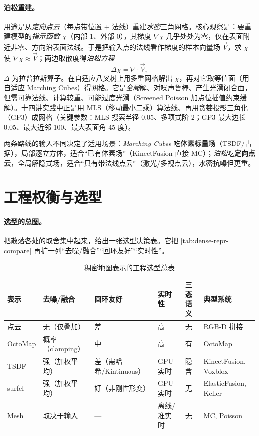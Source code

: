 \paragraph{泊松重建。}
用途是从\emph{定向点云}（每点带位置 $+$ 法线）重建\emph{水密}三角网格\cite{kazhdan2006poisson}。核心观察是：要重建模型的\emph{指示函数} $\chi$（内部 1、外部 0），其梯度 $\nabla\chi$ 几乎处处为零，仅在表面附近非零、方向沿表面法线。于是把输入点的法线看作梯度的样本向量场 $\vec{V}$，求 $\chi$ 使 $\nabla\chi\approx\vec{V}$；两边取散度得\emph{泊松方程}
\begin{equation}
  \Delta\chi=\nabla\cdot\vec{V},
  \label{eq:dense-poisson}
\end{equation}
$\Delta$ 为拉普拉斯算子。在自适应八叉树上用多重网格解出 $\chi$，再对它取等值面（用自适应 Marching Cubes）得网格。它是\emph{全局}解、对噪声鲁棒、产生光滑闭合面，但需可靠法线、计算较重、可能过度光滑（Screened Poisson 加点位插值约束缓解）。十四讲实践中正是用 MLS（移动最小二乘）算法线、再用贪婪投影三角化（GP3）成网格（关键参数：MLS 搜索半径 0.05、多项式阶 2；GP3 最大边长 0.05、最大近邻 100、最大表面角 45 度）。

\begin{insight}
两条路线的输入不同决定了适用场景：\emph{Marching Cubes} 吃\textbf{体素标量场}（TSDF/占据），局部逐立方体，适合“已有体素场”（KinectFusion 直接 MC）；\emph{泊松}吃\textbf{定向点云}，全局解隐式场，适合“只有带法线点云”（激光/多视点云），水密抗噪但更重。
\end{insight}

\section{工程权衡与选型}
\label{sec:dense-engineering}

\paragraph{选型的总图。}
把散落各处的取舍集中起来，给出一张选型决策表。它把 \cref{tab:dense-repr-compare} 再扩一列“去噪/融合”“回环友好”“实时性”。

\begin{table}[H]\centering\small
\caption{稠密地图表示的工程选型总表}
\label{tab:dense-engineering}
\begin{tabular}{p{} p{} p{} p{} p{} p{}}
\toprule
表示 & 去噪/融合 & 回环友好 & 实时性 & 三态语义 & 典型系统 \\
\midrule
点云 & 无（仅叠加） & 差 & 高 & 无 & RGB-D 拼接 \\
OctoMap & 概率（clamping） & 中 & 高 & 有 & OctoMap \\
TSDF & 强（加权平均） & 差（需哈希/Kintinuous） & GPU 实时 & 隐含 & KinectFusion, Voxblox \\
surfel & 强（加权平均） & 好（非刚性形变） & GPU 实时 & 无 & ElasticFusion, Keller \\
Mesh & 取决于输入 & --- & 离线/准实时 & 无 & MC, Poisson \\
\bottomrule
\end{tabular}
\end{table}

